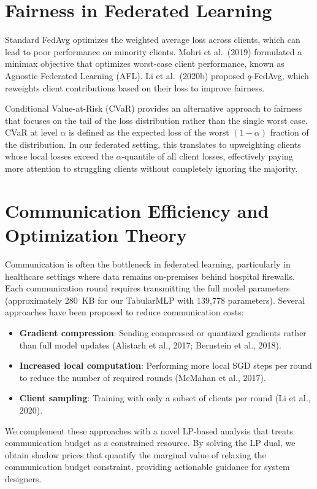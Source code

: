 \documentclass[11pt,a4paper]{report}
\begin{document}
\section{Fairness in Federated Learning}

Standard FedAvg optimizes the weighted average loss across clients, which can lead to poor performance on minority clients. Mohri et al.\ (2019) formulated a minimax objective that optimizes worst-case client performance, known as Agnostic Federated Learning (AFL). Li et al.\ (2020b) proposed $q$-FedAvg, which reweights client contributions based on their loss to improve fairness.

Conditional Value-at-Risk (CVaR) provides an alternative approach to fairness that focuses on the tail of the loss distribution rather than the single worst case. CVaR at level $\alpha$ is defined as the expected loss of the worst $(1-\alpha)$ fraction of the distribution. In our federated setting, this translates to upweighting clients whose local losses exceed the $\alpha$-quantile of all client losses, effectively paying more attention to struggling clients without completely ignoring the majority.

\section{Communication Efficiency and Optimization Theory}

Communication is often the bottleneck in federated learning, particularly in healthcare settings where data remains on-premises behind hospital firewalls. Each communication round requires transmitting the full model parameters (approximately 280~KB for our TabularMLP with 139,778 parameters). Several approaches have been proposed to reduce communication costs:

\begin{itemize}[leftmargin=2em]
\item \textbf{Gradient compression}: Sending compressed or quantized gradients rather than full model updates (Alistarh et al., 2017; Bernstein et al., 2018).
\item \textbf{Increased local computation}: Performing more local SGD steps per round to reduce the number of required rounds (McMahan et al., 2017).
\item \textbf{Client sampling}: Training with only a subset of clients per round (Li et al., 2020).
\end{itemize}

We complement these approaches with a novel LP-based analysis that treats communication budget as a constrained resource. By solving the LP dual, we obtain shadow prices that quantify the marginal value of relaxing the communication budget constraint, providing actionable guidance for system designers.
\end{document}
